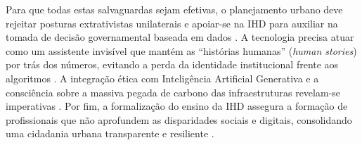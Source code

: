 \documentclass[
	12pt,				%
	oneside,			%
	a4paper,			%
	english,			%
	brazil				%
	]{abntex2ppgsi}
\begin{document}
    Para que todas estas salvaguardas sejam efetivas, o planejamento urbano deve rejeitar posturas extrativistas unilaterais e apoiar-se na IHD para auxiliar na tomada de decisão governamental baseada em dados \cite{Belizario2023Interacao}. A tecnologia precisa atuar como um assistente invisível que mantém as ``histórias humanas'' (\textit{human stories}) por trás dos números, evitando a perda da identidade institucional frente aos algoritmos \cite{calvetti2024human, Briggs2021, Calvetti2021173}. A integração ética com Inteligência Artificial Generativa e a consciência sobre a massiva pegada de carbono das infraestruturas revelam-se imperativas \cite{durango2024data, Stead2022, Turkay2021}. Por fim, a formalização do ensino da IHD assegura a formação de profissionais que não aprofundem as disparidades sociais e digitais, consolidando uma cidadania urbana transparente e resiliente \cite{coleti2024human, Kurze2023, hayes2024making, Refat2023, Chatzimichali2021160, Lindley2020}.
\end{document}
